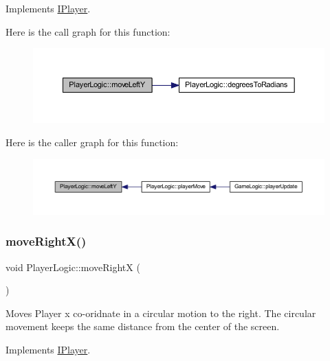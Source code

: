 Implements \hyperlink{class_i_player_ab4a195d99869ef7628e923e433fc8264}{I\+Player}.

Here is the call graph for this function\+:\nopagebreak
\begin{figure}[H]
\begin{center}
\leavevmode
\includegraphics[width=350pt]{class_player_logic_a006a7633ae5839d307bb90099f9d2745_cgraph}
\end{center}
\end{figure}
Here is the caller graph for this function\+:
\nopagebreak
\begin{figure}[H]
\begin{center}
\leavevmode
\includegraphics[width=350pt]{class_player_logic_a006a7633ae5839d307bb90099f9d2745_icgraph}
\end{center}
\end{figure}
\mbox{\label{class_player_logic_a9c96291506bb5347f2c503bba4100fd4}} 
\subsubsection{\texorpdfstring{move\+Right\+X()}{moveRightX()}}
{\footnotesize\ttfamily void Player\+Logic\+::move\+RightX (\begin{DoxyParamCaption}{ }\end{DoxyParamCaption})\hspace{0.3cm}{\ttfamily [virtual]}}



Moves Player x co-\/oridnate in a circular motion to the right. The circular movement keeps the same distance from the center of the screen. 



Implements \hyperlink{class_i_player_a59f3be9939ee5406cb215845b6cf00c4}{I\+Player}.

